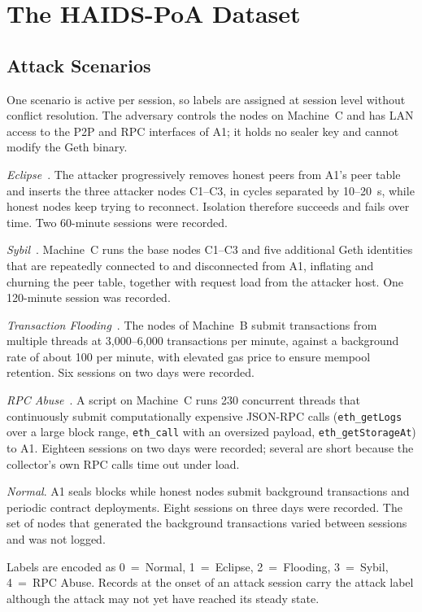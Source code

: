 \documentclass[journal]{IEEEtran}
\newcommand{\code}[1]{\texttt{\small #1}}
\begin{document}
\section{The HAIDS-PoA Dataset}\label{sec:dataset}
\subsection{Attack Scenarios}
One scenario is active per session, so labels are assigned at session level without conflict resolution. The adversary controls the nodes on Machine~C and has LAN access to the P2P and RPC interfaces of A1; it holds no sealer key and cannot modify the Geth binary.

\emph{Eclipse}~\cite{heilman2015,marcus2018,henningsen2019}. The attacker progressively removes honest peers from A1's peer table and inserts the three attacker nodes C1--C3, in cycles separated by 10--20~s, while honest nodes keep trying to reconnect. Isolation therefore succeeds and fails over time. Two 60-minute sessions were recorded.

\emph{Sybil}~\cite{douceur2002}. Machine~C runs the base nodes C1--C3 and five additional Geth identities that are repeatedly connected to and disconnected from A1, inflating and churning the peer table, together with request load from the attacker host. One 120-minute session was recorded.

\emph{Transaction Flooding}~\cite{baqer2016,pacheco2023}. The nodes of Machine~B submit transactions from multiple threads at 3{,}000--6{,}000 transactions per minute, against a background rate of about 100 per minute, with elevated gas price to ensure mempool retention. Six sessions on two days were recorded.

\emph{RPC Abuse}~\cite{saad2020}. A script on Machine~C runs 230 concurrent threads that continuously submit computationally expensive JSON-RPC calls (\code{eth\_getLogs} over a large block range, \code{eth\_call} with an oversized payload, \code{eth\_getStorageAt}) to A1. Eighteen sessions on two days were recorded; several are short because the collector's own RPC calls time out under load.

\emph{Normal}. A1 seals blocks while honest nodes submit background transactions and periodic contract deployments. Eight sessions on three days were recorded. The set of nodes that generated the background transactions varied between sessions and was not logged.

Labels are encoded as 0~=~Normal, 1~=~Eclipse, 2~=~Flooding, 3~=~Sybil, 4~=~RPC Abuse. Records at the onset of an attack session carry the attack label although the attack may not yet have reached its steady state.
\end{document}
